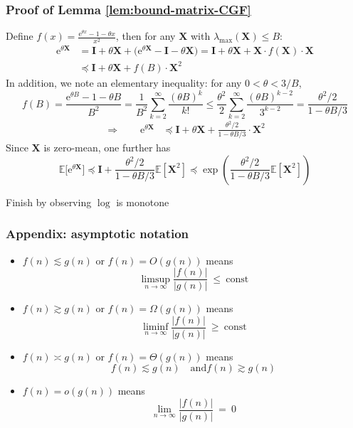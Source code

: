 \documentclass[compress,
mathserif,wide,%
]{beamer}
\begin{document}
\begin{frame}
\frametitle{Proof of Lemma \ref{lem:bound-matrix-CGF}} 

{\small

Define $f(x)=\frac{\mathrm{e}^{\theta x}-1-\theta x}{x^{2}}$, then
for any $\bm{X}$ with $\lambda_{\max}(\bm{X})\leq B$:
\begin{align*}
\mathrm{e}^{\theta\bm{X}} & =\bm{I}+\theta\bm{X}+\big(\mathrm{e}^{\theta\bm{X}}-\bm{I}-\theta\bm{X}\big)=\bm{I}+\theta\bm{X}+\bm{X}\cdot f(\bm{X})\cdot\bm{X}\\
 & \preceq\bm{I}+\theta\bm{X}+f(B)\cdot\bm{X}^{2}
\end{align*}
In addition, we note an elementary inequality: for any $0<\theta<3/B$,
%
\[
f(B)=\frac{\mathrm{e}^{\theta B}-1-\theta B}{B^{2}}=\frac{1}{B^{2}}\sum_{k=2}^{\infty}\frac{(\theta B)^{k}}{k!}\leq\frac{\theta^{2}}{2}\sum_{k=2}^{\infty}\frac{(\theta B)^{k-2}}{3^{k-2}}=\frac{\theta^{2}/2}{1-\theta B/3}
\]
%
\begin{align*}
	\Longrightarrow \qquad \mathrm{e}^{\theta\bm{X}} & \preceq\bm{I}+\theta\bm{X}+\frac{\theta^{2}/2}{1-\theta B/3}\cdot\bm{X}^{2}
\end{align*}
%
Since $\bm{X}$ is zero-mean, one further has
\[
\mathbb{E}\big[\mathrm{e}^{\theta\bm{X}}\big]\preceq\bm{I}+\frac{\theta^{2}/2}{1-\theta B/3}\mathbb{E}[\bm{X}^{2}]\preceq\exp\left(\frac{\theta^{2}/2}{1-\theta B/3}\mathbb{E}[\bm{X}^{2}]\right)
\]

}
Finish by observing $\log$ is monotone
\end{frame}





\begin{frame}
\frametitle{Appendix: asymptotic notation}

\begin{itemize}
   \itemsep1em
   \item  $f(n) \lesssim g(n)$ or $f(n) = O(g(n))$ means 
   \[
     \limsup_{n\rightarrow\infty} \frac{|f(n)|}{|g(n)|} ~\leq~ \text{const} 
   \]
   \item  $f(n) \gtrsim g(n)$ or $f(n) = \Omega(g(n))$ means 
   \[
     \liminf_{n\rightarrow\infty} \frac{|f(n)|}{|g(n)|} ~\geq~ \text{const} 
   \]
   \item  $f(n) \asymp g(n)$ or $f(n) = \Theta(g(n))$ means 
   \[
      f(n) \lesssim g(n) \quad \text{and} f(n) \gtrsim g(n)
   \]


   \item  $f(n) = o(g(n))$ means 
   \[
       \lim_{n\rightarrow\infty} \frac{|f(n)|}{|g(n)|} ~=~ 0
   \]

\end{itemize}

\end{frame}
\end{document}

